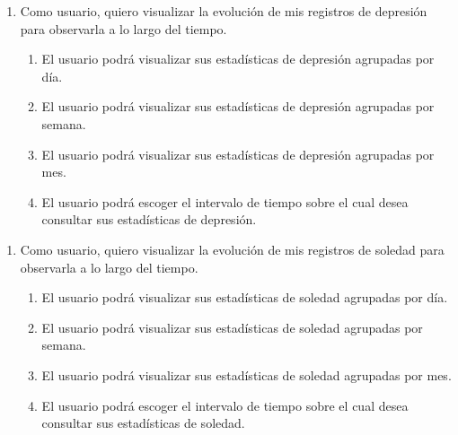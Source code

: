         \begin{enumerate}[resume=req-usuario,label=\textbf{\texttt{RU-\arabic*}}]
            \item \label{req:usuario:evolucion_depresion} Como usuario, quiero visualizar la evolución de mis registros de depresión para observarla a lo largo del tiempo.
            \begin{enumerate}[resume=req-funcionales,label=\textbf{\texttt{RF-\arabic*}}]
                \item \label{req:funcionales:evolucion_depresion_dia} El usuario podrá visualizar sus estadísticas de depresión agrupadas por día.
                \item \label{req:funcionales:evolucion_depresion_semana} El usuario podrá visualizar sus estadísticas de depresión agrupadas por semana.
                \item \label{req:funcionales:evolucion_depresion_mes} El usuario podrá visualizar sus estadísticas de depresión agrupadas por mes.
                \item \label{req:funcionales:evolucion_depresion_elegir} El usuario podrá escoger el intervalo de tiempo sobre el cual desea consultar sus estadísticas de depresión.
            \end{enumerate}
        \end{enumerate}
        \begin{enumerate}[resume=req-usuario,label=\textbf{\texttt{RU-\arabic*}}]
            \item \label{req:usuario:evolucion_soledad} Como usuario, quiero visualizar la evolución de mis registros de soledad para observarla a lo largo del tiempo.
            \begin{enumerate}[resume=req-funcionales,label=\textbf{\texttt{RF-\arabic*}}]
                \item \label{req:funcionales:evolucion_soledad_dia} El usuario podrá visualizar sus estadísticas de soledad agrupadas por día.
                \item \label{req:funcionales:evolucion_soledad_semana} El usuario podrá visualizar sus estadísticas de soledad agrupadas por semana.
                \item \label{req:funcionales:evolucion_soledad_mes} El usuario podrá visualizar sus estadísticas de soledad agrupadas por mes.
                \item \label{req:funcionales:evolucion_soledad_elegir} El usuario podrá escoger el intervalo de tiempo sobre el cual desea consultar sus estadísticas de soledad.
            \end{enumerate}
        \end{enumerate}

